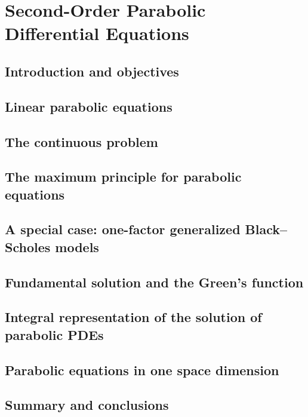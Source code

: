 \chapter{Second-Order Parabolic Differential Equations}

\section{Introduction and objectives}

\section{Linear parabolic equations}

\section{The continuous problem}

\section{The maximum principle for parabolic equations}

\section{A special case: one-factor generalized Black–Scholes models}

\section{Fundamental solution and the Green’s function}

\section{Integral representation of the solution of parabolic PDEs}

\section{Parabolic equations in one space dimension}

\section{Summary and conclusions}
